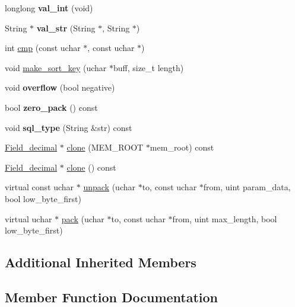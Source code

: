 \begin{DoxyCompactItemize}
longlong {\bfseries val\+\_\+int} (void)
\item 
\mbox{\label{classField__decimal_a034c8e4af77ee722c954a8f0f539910b}} 
String $\ast$ {\bfseries val\+\_\+str} (String $\ast$, String $\ast$)
\item 
int \mbox{\hyperlink{classField__decimal_ab82c27bf2bef656e8ba820be255262d1}{cmp}} (const uchar $\ast$, const uchar $\ast$)
\item 
void \mbox{\hyperlink{classField__decimal_aa1510cbae7dff99eb2a804dd988ed6f0}{make\+\_\+sort\+\_\+key}} (uchar $\ast$buff, size\+\_\+t length)
\item 
\mbox{\label{classField__decimal_a9825cfba8d4da8cd9a71874ea6858839}} 
void {\bfseries overflow} (bool negative)
\item 
\mbox{\label{classField__decimal_a60cc3f18aa276aa02c089eace1fa8db1}} 
bool {\bfseries zero\+\_\+pack} () const
\item 
\mbox{\label{classField__decimal_af30125b9bab79ee500c6e019297d792f}} 
void {\bfseries sql\+\_\+type} (String \&str) const
\item 
\mbox{\hyperlink{classField__decimal}{Field\+\_\+decimal}} $\ast$ \mbox{\hyperlink{classField__decimal_a9049654d347e58388b6f3b7f06e5bb94}{clone}} (M\+E\+M\+\_\+\+R\+O\+OT $\ast$mem\+\_\+root) const
\item 
\mbox{\hyperlink{classField__decimal}{Field\+\_\+decimal}} $\ast$ \mbox{\hyperlink{classField__decimal_abedb8750121b8822d71ae8b6d8226964}{clone}} () const
\item 
virtual const uchar $\ast$ \mbox{\hyperlink{classField__decimal_a175db70d41ae30df50a1ec04d8680363}{unpack}} (uchar $\ast$to, const uchar $\ast$from, uint param\+\_\+data, bool low\+\_\+byte\+\_\+first)
\item 
virtual uchar $\ast$ \mbox{\hyperlink{classField__decimal_a85c1f4498b4f8f773056efcf6c3a901a}{pack}} (uchar $\ast$to, const uchar $\ast$from, uint max\+\_\+length, bool low\+\_\+byte\+\_\+first)
\end{DoxyCompactItemize}
\subsection*{Additional Inherited Members}


\subsection{Member Function Documentation}
\mbox{\label{classField__decimal_a9049654d347e58388b6f3b7f06e5bb94}} 
